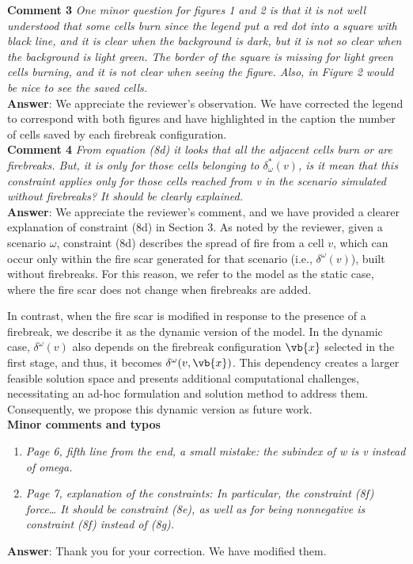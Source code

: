 \documentclass[12pt]{article}
\begin{document}
\noindent \textbf{Comment 3} \textit{One minor question for figures 1 and 2 is that it is not well understood that some cells burn since the legend put a red dot into a square with black line, and it is clear when the background is dark, but it is not so clear when the background is light green. The border of the square is missing for light green cells burning, and it is not clear when seeing the figure. Also, in Figure 2 would be nice to see the saved cells.} \\

\textbf{Answer}: We appreciate the reviewer’s observation. We have corrected the legend to correspond with both figures and have highlighted in the caption the number of cells saved by each firebreak configuration. \\

\noindent \textbf{Comment 4} \textit{From equation (8d) it looks that all the adjacent cells burn or are firebreaks. But, it is only for those cells belonging to $\delta^{\ast}_\omega (v)$, is it mean that this constraint applies only for those cells reached from v in the scenario simulated without firebreaks? It should be clearly explained.}\\ 

\textbf{Answer}: We appreciate the reviewer’s comment, and we have provided a clearer explanation of constraint (8d) in Section 3. As noted by the reviewer, given a scenario $\omega$, constraint (8d) describes the spread of fire from a cell $v$, which can occur only within the fire scar generated for that scenario (i.e., $\delta^{\omega}(v)$), built without firebreaks. For this reason, we refer to the model as the static case, where the fire scar does not change when firebreaks are added. 

In contrast, when the fire scar is modified in response to the presence of a firebreak, we describe it as the dynamic version of the model. In the dynamic case, $ \delta^\omega (v) $ also depends on the firebreak configuration $\vb{x}$ selected in the first stage, and thus, it becomes $ \delta^\omega (v, \vb{x}) $. This dependency creates a larger feasible solution space and presents additional computational challenges, necessitating an ad-hoc formulation and solution method to address them. Consequently, we propose this dynamic version as future work. \\

\noindent \textbf{Minor comments and typos}
\begin{enumerate}

    \item \textit{Page 6, fifth line from the end, a small mistake: the subindex of w is v instead of omega.}
    \item \textit{Page 7, explanation of the constraints: In particular, the constraint (8f) force… It should be constraint (8e), as well as for being nonnegative is constraint (8f) instead of (8g).}
\end{enumerate}

\textbf{Answer}: Thank you for your correction. We have modified them.

%
%
\end{document}
